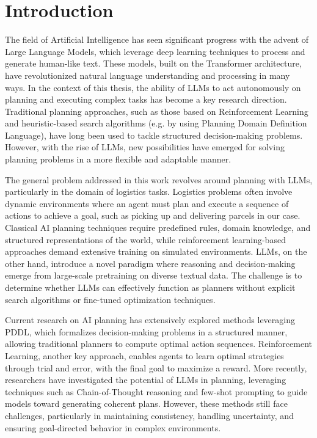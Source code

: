 \chapter{Introduction}
\label{cha:introduction}

The field of Artificial Intelligence has seen significant progress with the
advent of Large Language Models, which leverage deep learning techniques to process
and generate human-like text. These models, built on the Transformer architecture,
have revolutionized natural language understanding and processing in many ways. In
the context of this thesis, the ability of LLMs to act autonomously on planning
and executing complex tasks has become a key research direction. Traditional planning
approaches, such as those based on Reinforcement Learning and heuristic-based
search algorithms (e.g. by using Planning Domain Definition Language), have long
been used to tackle structured decision-making problems. However, with the rise
of LLMs, new possibilities have emerged for solving planning problems in a more flexible
and adaptable manner.

The general problem addressed in this work revolves around planning with LLMs,
particularly in the domain of logistics tasks. Logistics problems often involve dynamic
environments where an agent must plan and execute a sequence of actions to achieve
a goal, such as picking up and delivering parcels in our case. Classical AI planning
techniques require predefined rules, domain knowledge, and structured representations
of the world, while reinforcement learning-based approaches demand extensive
training on simulated environments. LLMs, on the other hand, introduce a novel paradigm
where reasoning and decision-making emerge from large-scale pretraining on diverse
textual data. The challenge is to determine whether LLMs can effectively
function as planners without explicit search algorithms or fine-tuned
optimization techniques.

Current research on AI planning has extensively explored methods leveraging PDDL,
which formalizes decision-making problems in a structured manner, allowing
traditional planners to compute optimal action sequences. Reinforcement Learning,
another key approach, enables agents to learn optimal strategies through trial and
error, with the final goal to maximize a reward. More recently, researchers have
investigated the potential of LLMs in planning, leveraging techniques such as Chain-of-Thought
reasoning and few-shot prompting to guide models toward generating coherent plans.
However, these methods still face challenges, particularly in maintaining
consistency, handling uncertainty, and ensuring goal-directed behavior in
complex environments.

